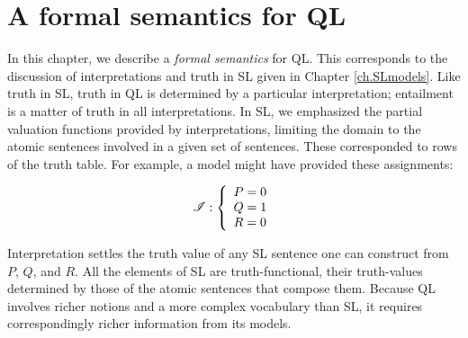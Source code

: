 ﻿%
\chapter{A formal semantics for QL}
\label{ch.QL.models}




In this chapter, we describe a \emph{formal semantics} for QL. This corresponds to the discussion of interpretations and truth in SL given in Chapter \ref{ch.SLmodels}. Like truth in SL, truth in QL is determined by a particular interpretation; entailment is a matter of truth in all interpretations. In SL, we emphasized the partial valuation functions provided by interpretations, limiting the domain to the atomic sentences involved in a given set of sentences. These corresponded to rows of the truth table. For example, a model  might have provided these assignments:

\begin{displaymath}
\mathscr{I} :
\left\{
	\begin{array}{ll}
	P = 0\\
	Q = 1\\
	R = 0
	\end{array}
\right.
\end{displaymath}

Interpretation  settles the truth value of any SL sentence one can construct from $P$, $Q$, and $R$. All the elements of SL {\color{black}are truth-functional, their truth-values determined by those of the atomic sentences that compose them}. Because QL involves richer notions and a more complex vocabulary than SL, it requires correspondingly richer information from its models.


